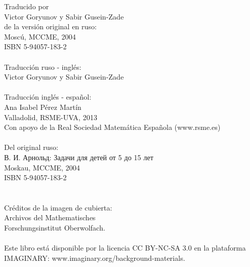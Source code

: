 \documentclass[12pt]{article}  %
\begin{document}
{%
Traducido por \\
Victor Goryunov y Sabir Gusein-Zade \\
de la versi\'on original en ruso: \\
Mosc\'u, MCCME, 2004 \\
ISBN 5-94057-183-2\\
\\
Traducci\'on ruso - ingl\'es:\\
Victor Goryunov y Sabir Gusein-Zade\\
\\
Traducci\'on ingl\'es - espa\~{n}ol:\\
Ana Isabel P\'erez Mart\'in\\
Valladolid, RSME-UVA, 2013\\
Con apoyo de la Real Sociedad Matem\'atica Espa\~{n}ola (www.rsme.es)\\
\\
Del original ruso:\\
\textrussian{В. И. Арнольд: Задачи для детей от 5 до 15 лет}\\
Moskau, MCCME, 2004\\
ISBN 5-94057-183-2\\
\\
\\
Cr\'editos de la imagen de cubierta:\\
Archivos del 
Mathematisches \\Forschungsinstitut Oberwolfach.\\
\\
Este libro est\'a disponible por la licencia CC BY-NC-SA 3.0 en la plataforma IMAGINARY: www.imaginary.org/background-materials.
}
\end{document}
